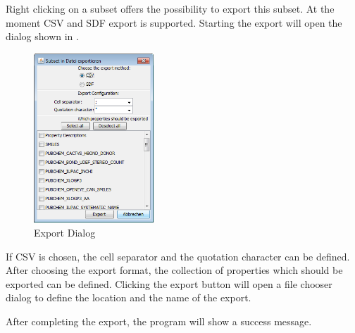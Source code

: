 Right clicking on a subset offers the possibility to export this subset. At the moment CSV and SDF export is supported. Starting the export will open the dialog shown in .

\begin{figure}[!htb]
\centering
\includegraphics[width=0.4\textwidth]{images/sh_export_dialog}
\caption{Export Dialog}
\label{fig:export}
\end{figure} 

If CSV is chosen, the cell separator and the quotation character can be defined. After choosing the export format, the collection of properties which should be exported can be defined.
Clicking the export button will open a file chooser dialog to define the location and the name of the export.

After completing the export, the program will show a success message.

